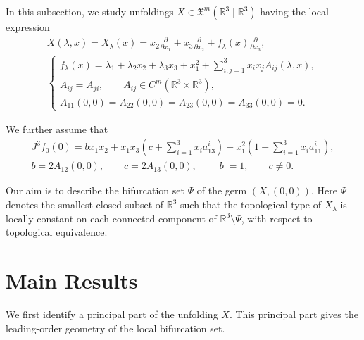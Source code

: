 \documentclass[12pt]{article}
\newtheorem{remark definition}{Remark Definition}[section]
\begin{document}
In this subsection, we study unfoldings $X\in \mathfrak{X}^{m}(\mathbb{R}^{3}\mid \mathbb{R}^{3})$
having the local expression
\begin{equation}
	\label{GSUH5}
	\tag{H5}
	\begin{array}{l}
		X(\lambda,x)=X_{\lambda}(x)
		=
		x_2\frac{\partial}{\partial x_1}
		+
		x_3\frac{\partial}{\partial x_2}
		+
		f_{\lambda}(x)\frac{\partial}{\partial x_3},
		\\[0.2cm]
		\begin{cases}
			f_{\lambda}(x)
			=
			\lambda_1+\lambda_2x_2+\lambda_3x_3+x_1^2
			+
			\displaystyle\sum_{i,j=1}^{3}x_ix_jA_{ij}(\lambda,x),
			\\[0.2cm]
			A_{ij}=A_{ji},
			\qquad
			A_{ij}\in C^m(\mathbb{R}^3\times \mathbb{R}^3),
			\\[0.2cm]
			A_{11}(0,0)=A_{22}(0,0)=A_{23}(0,0)=A_{33}(0,0)=0.
		\end{cases}
	\end{array}
\end{equation}

We further assume that
\begin{equation}
	\label{GSUH6}
	\tag{H6}
	\begin{array}{l}
		J^3f_0(0)
		=
		bx_1x_2
		+
		x_1x_3
		\left(
		c+\displaystyle\sum_{i=1}^{3}x_i a_{13}^{i}
		\right)
		+
		x_1^2
		\left(
		1+\displaystyle\sum_{i=1}^{3}x_i a_{11}^{i}
		\right),
		\\[0.2cm]
		b=2A_{12}(0,0),
		\qquad
		c=2A_{13}(0,0),
		\qquad
		|b|=1,
		\qquad
		c\neq 0.
	\end{array}
\end{equation}

Our aim is to describe the bifurcation set $\Psi$ of the germ
$(X,(0,0))$. Here $\Psi$ denotes the smallest closed subset of
$\mathbb{R}^3$ such that the topological type of $X_\lambda$ is locally
constant on each connected component of $\mathbb{R}^3\setminus \Psi$,
with respect to topological equivalence.
\section{Main Results}
\label{Sect4_GPU}
We first identify a principal part of the unfolding $X$. This principal
part gives the leading-order geometry of the local bifurcation set.
\end{document}
